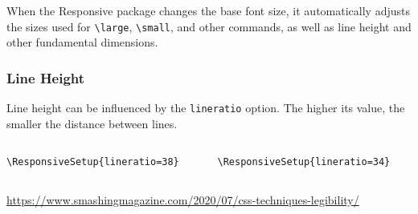 When the Responsive package changes the base font size, it automatically
adjusts the sizes used for \verb|\large|, \verb|\small|, and other commands, as well as line
height and other fundamental dimensions.


\begin{frame}[fragile]
  \frametitle{Line Height}
  Line height can be influenced by the \texttt{lineratio} option. 
The higher its value, the smaller the distance between lines.

\begin{columns}
  \begin{column}{0.5\textwidth}
\begin{verbatim}
\ResponsiveSetup{lineratio=38}
\end{verbatim}

\end{column}
  \begin{column}{0.5\textwidth}
\begin{verbatim}
\ResponsiveSetup{lineratio=34}
\end{verbatim}

\end{column}
\end{columns}

\url{https://www.smashingmagazine.com/2020/07/css-techniques-legibility/}

\end{frame}



